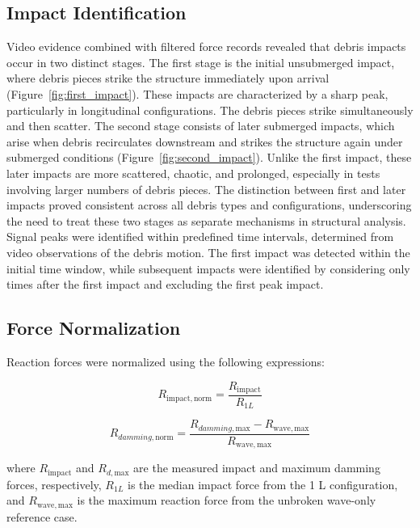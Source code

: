 \documentclass{article}
\begin{document}
{\subsection{Impact Identification}
Video evidence combined with filtered force records revealed that debris impacts occur in two distinct stages. The first stage is the initial unsubmerged impact, where debris pieces strike the structure immediately upon arrival (Figure~\ref{fig:first_impact}). These impacts are characterized by a sharp peak, particularly in longitudinal configurations. The debris pieces strike simultaneously and then scatter. The second stage consists of later submerged impacts, which arise when debris recirculates downstream and strikes the structure again under submerged conditions (Figure~\ref{fig:second_impact}). Unlike the first impact, these later impacts are more scattered, chaotic, and prolonged, especially in tests involving larger numbers of debris pieces. The distinction between first and later impacts proved consistent across all debris types and configurations, underscoring the need to treat these two stages as separate mechanisms in structural analysis.
Signal peaks were identified within predefined time intervals, determined from video observations of the debris motion. The first impact was detected within the initial time window, while subsequent impacts were identified by considering only times after the first impact and excluding the first peak impact. 

\subsection{Force Normalization}

Reaction forces were normalized using the following expressions:

\begin{equation}
    R_{\mathrm{impact,norm}} = 
    \frac{R_{\mathrm{impact}}}{R_{1L}}
    \label{eq:impact_norm}
\end{equation}

\begin{equation}
    R_{damming,\mathrm{norm}} = 
    \frac{R_{damming,\mathrm{max}} - R_{\mathrm{wave,max}}}
         {R_{\mathrm{wave,max}}}
    \label{eq:damming_norm}
\end{equation}

where \( R_{\mathrm{impact}} \) and \( R_{d,\mathrm{max}} \) are the measured impact and maximum damming forces, respectively, 
\( R_{1L} \) is the median impact force from the 1 L configuration, 
and \( R_{\mathrm{wave,max}} \) is the maximum reaction force from the unbroken wave-only reference case.


}
\end{document}
